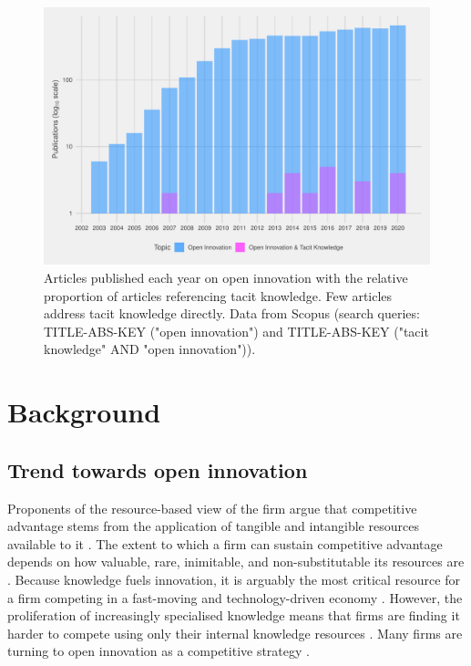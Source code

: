 \begin{figure}[p]
\centering
\includegraphics[width=0.9\linewidth]{Images/tk_oi.pdf}
\caption[Articles published each year on open innovation]{Articles published each year on open innovation with the relative proportion of articles referencing tacit knowledge. Few articles address tacit knowledge directly. Data from Scopus (search queries: TITLE-ABS-KEY ("open innovation") and TITLE-ABS-KEY ("tacit knowledge"  AND  "open innovation")).}
\label{fig:biblio}
\end{figure}

\section{Background}

\subsection{Trend towards open innovation} \label{sss:oi}

Proponents of the resource-based view of the firm argue that competitive advantage stems from the application of tangible and intangible resources available to it \citep{wernerfelt1984resource,peteraf1993cornerstones}. The extent to which a firm can sustain competitive advantage depends on how valuable, rare, inimitable, and non-substitutable its resources are \citep{barney1991firm}. Because knowledge fuels innovation, it is arguably the most critical resource for a firm competing in a fast-moving and technology-driven economy \citep{grant1996toward,urbancova2013competitive}. However, the proliferation of increasingly specialised knowledge means that firms are finding it harder to compete using only their internal knowledge resources \citep{chesbrough2009open,enkel2009open}. Many firms are turning to open innovation as a competitive strategy \citep{stanko2017under,lee2019does}. \medskip

